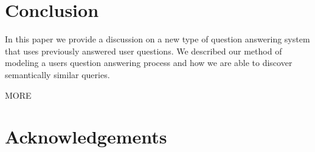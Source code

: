 
\section{Conclusion}

In this paper we provide a discussion on a new type of question answering system that uses previously answered user questions.  We described our method of modeling a users question answering process and how we are able to discover semantically similar queries.

MORE

\section{Acknowledgements}
